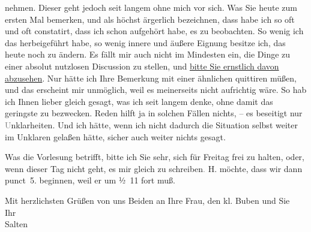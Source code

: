                nehmen. Dieser geht jedoch seit langem ohne mich vor sich. Was Sie heute zum ersten Mal bemerken, und als höchst ärgerlich
               bezeichnen, dass habe ich so oft und oft constatirt, dass ich schon aufgehört habe,
               es zu beobachten. So wenig ich das herbeigeführt habe, so wenig innere und äußere
               Eignung besitze ich, das heute noch zu ändern. Es fällt mir auch nicht im Mindesten
               ein, die Dinge zu einer absolut nutzlosen Discussion zu stellen, und \uline{bitte Sie ernstlich davon abzusehen}. Nur hätte ich
               Ihre Bemerkung mit einer ähnlichen quittiren müßen, und das erscheint mir unmöglich,
               weil es meinerseits nicht aufrichtig wäre. So hab ich Ihnen lieber gleich gesagt, was
               ich seit langem denke, ohne damit das geringste zu bezwecken. Reden hilft ja in
               solchen Fällen nichts, – es beseitigt nur \textcolor{gray}{U}nklarheiten. Und ich
               hätte, wenn ich nicht dadurch die Situation selbst weiter im Unklaren gelaßen hätte,
               sicher auch weiter nichts gesagt.\pend
           
\pstart
           {\pb}Was die Vorlesung betrifft,
               bitte ich Sie sehr, sich für Freitag frei zu halten,
               oder, wenn dieser Tag nicht geht, es mir gleich zu schreiben\textcolor{gray}{.}{ }H. möchte, dass wir dann punct 5.
               beginnen, weil er um ½ 11 fort muß.\pend
           
\pstart
           Mit herzlichsten Grüßen von uns Beiden an Ihre Frau,
               den kl. Buben und Sie
               {\\}Ihr {\\}\spacefill\mbox{Salten}\pend
           \endnumbering{}  
      
